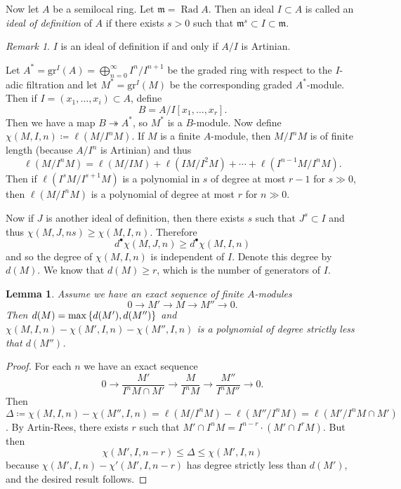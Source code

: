 \documentclass[leqno, openany]{memoir}
\newtheorem{lem}[thm]{Lemma}
\theoremstyle{definition}
\theoremstyle{remark}
\newtheorem{rmk}[thm]{Remark}
\theoremstyle{plain}
\theoremstyle{definition}
\theoremstyle{remark}
\newcommand{\mf}[1]{\mathfrak{#1}}
\newcommand{\mr}[1]{\mathrm{#1}}
\begin{document}
Now let $A$ be a semilocal ring. Let $\mf{m} = \operatorname{Rad} A$. Then an
ideal $I \subset A$ is called an \textit{ideal of definition} of $A$ if there
exists $s > 0$ such that $\mf{m}^s \subset I \subset \mf{m}$.

\begin{rmk} $I$ is an ideal of definition if and only if $A/I$ is Artinian.
\end{rmk}

Let $A^* = \mr{gr}^I(A) = \bigoplus_{n=0}^{\infty} I^n / I^{n+1}$ be the graded
ring with respect to the $I$-adic filtration and let $M^* = \mr{gr}^I(M)$ be
the corresponding graded $A^*$-module. Then if $I = (x_1, \ldots, x_i) \subset
A$, define \[ B = A/I[x_1, \ldots, x_r]. \] Then we have a map $B
\twoheadrightarrow A^*$, so $M^*$ is a $B$-module. Now define $\chi(M,I,n)
\coloneqq \ell(M / I^nM)$. If $M$ is a finite $A$-module, then $M/I^n M$ is of
finite length (because $A/I^n$ is Artinian) and thus \[ \ell(M/I^nM) =
\ell(M/IM) + \ell(IM/I^2M) + \cdots + \ell(I^{n-1}M / I^n M). \] Then if
$\ell(I^sM / I^{s+1}M)$ is a polynomial in $s$ of degree at most $r-1$ for $s
\gg 0$, then $\ell(M/I^nM)$ is a polynomial of degree at most $r$ for $n \gg
0$.

Now if $J$ is another ideal of definition, then there exists $s$ such that $J^s
\subset I$ and thus $\chi (M, J, ns) \geq \chi(M,I,n)$. Therefore \[
d^{\bullet} \chi(M,J,n) \geq d^{\bullet} \chi(M,I,n) \] and so the degree of
$\chi(M,I,n)$ is independent of $I$. Denote this degree by $d(M)$. We know that
$d(M) \geq r$, which is the number of generators of $I$.

\begin{lem} Assume we have an exact sequence of finite $A$-modules \[ 0 \to M'
\to M \to M'' \to 0. \] Then $d(M) = \max \qty{ d(M'), d(M'') }$ and $\chi(M,
I,n) - \chi(M', I, n) - \chi(M'', I, n)$ is a polynomial of degree strictly
less that $d(M'')$.  \end{lem}

\begin{proof} For each $n$ we have an exact sequence \[ 0 \to \frac{M'}{I^n M
\cap M'} \to \frac{M}{I^nM} \to \frac{M''}{I^n M''} \to 0. \] Then $\Delta
\coloneqq \chi(M,I,n) - \chi(M'', I, n) = \ell(M/I^nM) - \ell(M'' / I^n M) =
\ell(M' / I^n M \cap M')$. By Artin-Rees, there exists $r$ such that $M' \cap
I^n M = I^{n-r} \cdot (M' \cap I^r M)$. But then \[ \chi(M',I, n-r) \leq \Delta
\leq \chi(M', I, n) \] because $\chi(M', I,n) - \chi'(M', I, n-r)$ has degree
strictly less than $d(M')$, and the desired result follows.  \end{proof}
\end{document}
